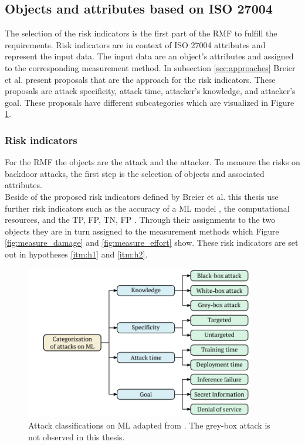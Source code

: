 \subsection{Objects and attributes based on ISO 27004}
\label{sec:risk_indicators}

The selection of the risk indicators is the first part of the RMF to fulfill the requirements. Risk indicators are in context of ISO 27004 \cite{ISO_27004_2009} attributes and represent the input data. The input data are an object's attributes and assigned to the corresponding measurement method. In subsection \ref{sec:approaches} Breier et al. \cite{DBLP:journals/corr/abs-2012-04884} present proposals that are the approach for the risk indicators. These proposals are attack specificity, attack time, attacker's knowledge, and attacker's goal. These proposals have different subcategories which are visualized in Figure \ref{fig:classifi_attacks_ml}.

\subsubsection*{Risk indicators}

For the RMF the objects are the attack and the attacker. To measure the risks on backdoor attacks, the first step is the selection of objects and associated attributes. \\ Beside of the proposed risk indicators defined by Breier et al. this thesis use further risk indicators such as the accuracy of a ML model \cite{DBLP:journals/soco/GarciaFLH09}, the computational resources, and the TP, FP, TN, FP \cite{DBLP:journals/symmetry/PhamJAADYPNLGPT20}. Through their assignments to the two objects they are in turn assigned to the measurement methods which Figure \ref{fig:measure_damage} and \ref{fig:measure_effort} show. These risk indicators are set out in hypotheses \ref{itm:h1} and \ref{itm:h2}.

\begin{figure}[ht!]
  \centering
  \includegraphics[width=10cm]{pictures/classifi_attacks_ml.png}
  \caption{Attack classifications on ML adapted from \cite{DBLP:journals/corr/abs-2012-04884}. The grey-box attack is not observed in this thesis.}
  \label{fig:classifi_attacks_ml}
\end{figure}

